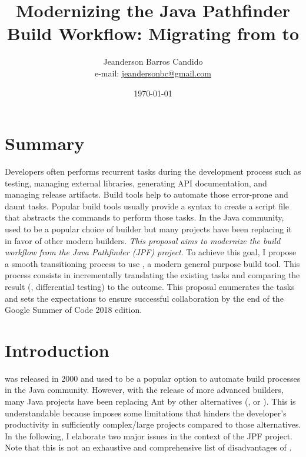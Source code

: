 \documentclass[a4paper, 12pt]{article}
\author{Jeanderson Barros Candido\\e-mail: \url{jeandersonbc@gmail.com}}
\title{Modernizing the Java Pathfinder Build Workflow: Migrating from \ant{} to
\gradle{}}
\date{\today}
\begin{document}
\maketitle

\section*{Summary}

Developers often performs recurrent tasks during the development process such
as testing, managing external libraries, generating API documentation, and
managing release artifacts.
Build tools help to automate those error-prone and daunt tasks.
Popular build tools usually provide a syntax to create a script file that
abstracts the commands to perform those tasks.
In the Java community, \ant{} used to be a popular choice of builder but many
projects have been replacing it in favor of other modern builders.
\emph{This proposal aims to modernize the build workflow from the Java
Pathfinder (JPF) project}.
To achieve this goal, I propose a smooth transitioning process to use
\gradle{}, a modern general purpose build tool.
This process consists in incrementally translating the existing \ant{} tasks
and comparing the result (\ie, differential testing) to the \ant{} outcome.
This proposal enumerates the tasks and sets the expectations to ensure
successful collaboration by the end of the Google Summer of Code 2018 edition.

\section{Introduction}
\label{sec:intro}

\ant{}\cite{page:ant} was released in 2000 and used to be a popular option to
automate build processes in the Java community.
However, with the release of more advanced builders, many Java projects have
been replacing Ant by other alternatives (\eg, \gradle{}\cite{page:gradle} or
\maven{}\cite{page:maven}).
This is understandable because \ant{} imposes some limitations that hinders the
developer's productivity in sufficiently complex/large projects compared to
those alternatives.
In the following, I elaborate two major issues in the context of the JPF
project.
Note that this is not an exhaustive and comprehensive list of disadvantages of
\ant{}.
\end{document}
